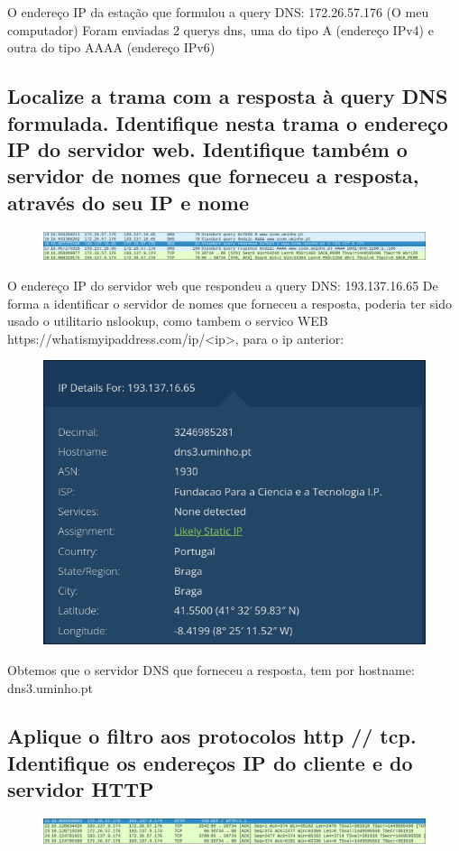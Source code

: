 \documentclass{article}
\begin{document}
O endereço IP da estação que formulou a query DNS: 172.26.57.176 (O meu computador)
Foram enviadas 2 querys dns, uma do tipo A (endereço IPv4) e outra do tipo AAAA (endereço IPv6)

\subsection{Localize a trama com a resposta à query DNS formulada. Identifique nesta trama o endereço IP do
servidor web. Identifique também o servidor de nomes que forneceu a resposta, através do seu IP e nome}

\begin{figure}[h!]
    \centering
    \includegraphics[width=1\linewidth]{images/dns_response.png}
\end{figure}

O endereço IP do servidor web que respondeu a query DNS: 193.137.16.65
De forma a identificar o servidor de nomes que forneceu a resposta, poderia ter sido usado o utilitario nslookup, como tambem o servico WEB https://whatismyipaddress.com/ip/\textless ip\textgreater,
para o ip anterior:
\begin{figure}[h!]
    \centering
    \includegraphics[width=0.5\linewidth]{images/whats.png}
\end{figure}

Obtemos que o servidor DNS que forneceu a resposta, tem por hostname: dns3.uminho.pt

\subsection{Aplique o filtro aos protocolos http // tcp. Identifique os endereços IP do cliente e do servidor HTTP}
\begin{figure}[h!]
    \centering
    \includegraphics[width=1\linewidth]{images/http_ip.png}
\end{figure}
\end{document}
